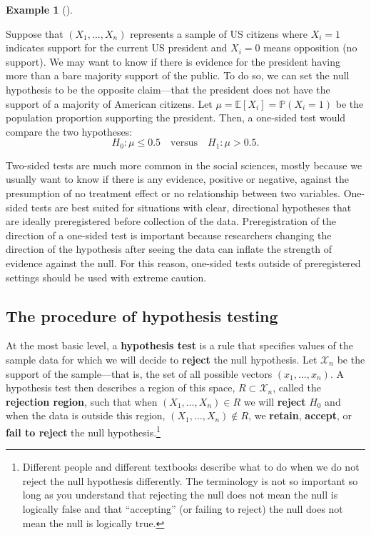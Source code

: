 \documentclass[
  13pt,
  letterpaper,
  DIV=11,
  numbers=noendperiod]{scrreprt}
\newcommand{\E}{\mathbb{E}}
\renewcommand{\P}{\mathbb{P}}
\theoremstyle{plain}
\theoremstyle{plain}
\theoremstyle{definition}
\theoremstyle{definition}
\newtheorem{example}{Example}[chapter]
\theoremstyle{remark}
\begin{document}
\begin{example}[]\protect\hypertarget{exm-biden}{}\label{exm-biden}

Suppose that \((X_1, \ldots, X_n)\) represents a sample of US citizens
where \(X_i = 1\) indicates support for the current US president and
\(X_i = 0\) means opposition (no support). We may want to know if there
is evidence for the president having more than a bare majority support
of the public. To do so, we can set the null hypothesis to be the
opposite claim---that the president does not have the support of a
majority of American citizens. Let \(\mu = \E[X_i] = \P(X_i = 1)\) be
the population proportion supporting the president. Then, a one-sided
test would compare the two hypotheses: \[ 
H_0: \mu \leq 0.5 \quad\text{versus}\quad H_1: \mu > 0.5.
\]

\end{example}

Two-sided tests are much more common in the social sciences, mostly
because we usually want to know if there is any evidence, positive or
negative, against the presumption of no treatment effect or no
relationship between two variables. One-sided tests are best suited for
situations with clear, directional hypotheses that are ideally
preregistered before collection of the data. Preregistration of the
direction of a one-sided test is important because researchers changing
the direction of the hypothesis after seeing the data can inflate the
strength of evidence against the null. For this reason, one-sided tests
outside of preregistered settings should be used with extreme caution.

\subsection{The procedure of hypothesis
testing}\label{the-procedure-of-hypothesis-testing}

At the most basic level, a \textbf{hypothesis test} is a rule that
specifies values of the sample data for which we will decide to
\textbf{reject} the null hypothesis. Let \(\mathcal{X}_n\) be the
support of the sample---that is, the set of all possible vectors
\((x_1, \ldots, x_n)\). A hypothesis test then describes a region of
this space, \(R \subset \mathcal{X}_n\), called the \textbf{rejection
region}, such that when \((X_1, \ldots, X_n) \in R\) we will
\textbf{reject} \(H_0\) and when the data is outside this region,
\((X_1, \ldots, X_n) \notin R\), we \textbf{retain}, \textbf{accept}, or
\textbf{fail to reject} the null hypothesis.\footnote{Different people
  and different textbooks describe what to do when we do not reject the
  null hypothesis differently. The terminology is not so important so
  long as you understand that rejecting the null does not mean the null
  is logically false and that ``accepting'' (or failing to reject) the
  null does not mean the null is logically true.}
\end{document}
